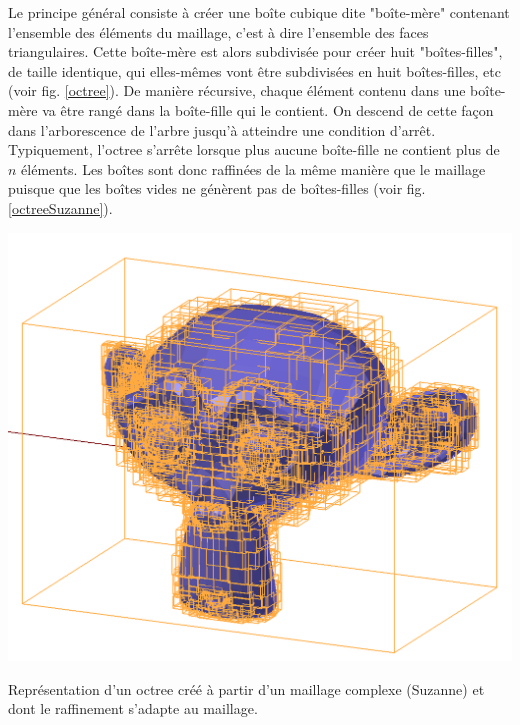 Le principe général consiste à créer une boîte cubique dite "boîte-mère" contenant l'ensemble des éléments du maillage, c'est à dire l'ensemble des faces triangulaires. Cette boîte-mère est alors subdivisée pour créer huit "boîtes-filles", de taille identique, qui elles-mêmes vont être subdivisées en huit boîtes-filles, etc (voir fig. \ref{octree}). De manière récursive, chaque élément contenu dans une boîte-mère va être rangé dans la boîte-fille qui le contient. On descend de cette façon dans l'arborescence de l'arbre jusqu'à atteindre une condition d'arrêt. Typiquement, l'\gls{octree} s'arrête lorsque plus aucune boîte-fille ne contient plus de $n$ éléments. Les boîtes sont donc raffinées de la même manière que le maillage puisque que les boîtes vides ne génèrent pas de boîtes-filles (voir fig. \ref{octreeSuzanne}).

\begin{figureth}
	\includegraphics[width=0.6\linewidth]{images/octreeSuzanne}
	\caption{Représentation d'un \gls{octree} créé à partir d'un maillage complexe (Suzanne) et dont le raffinement s'adapte au maillage.}
	\label{octreeSuzanne}
\end{figureth}


